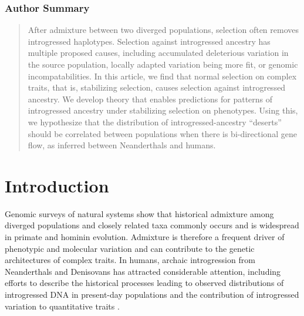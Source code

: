 \documentclass[10pt,letterpaper]{article}
\begin{document}
\begin{center}
    \subsubsection*{Author Summary}
\end{center}
\small
\begin{quote}

    After admixture between two diverged populations, selection often removes
    introgressed haplotypes. Selection against introgressed ancestry has
    multiple proposed causes, including accumulated deleterious variation in
    the source population, locally adapted variation being more fit, or genomic
    incompatabilities. In this article, we find that normal selection on
    complex traits, that is, stabilizing selection, causes selection against
    introgressed ancestry. We develop theory that enables predictions for
    patterns of introgressed ancestry under stabilizing selection on
    phenotypes. Using this, we hypothesize that the distribution of
    introgressed-ancestry ``deserts'' should be correlated between populations
    when there is bi-directional gene flow, as inferred between Neanderthals
    and humans.

\end{quote}

\normalsize

\onehalfspacing

\section*{Introduction}

Genomic surveys of natural systems show that historical admixture among
diverged populations and closely related taxa commonly occurs
\cite{brandvain2014speciation, skoglund2015ancient, suvorov2022widespread} and
is widespread in primate \cite{tung2017contribution, sorensen2023genome} and
hominin \cite{wolf2018outstanding, peter2020100} evolution. Admixture is
therefore a frequent driver of phenotypic and molecular variation and can
contribute to the genetic architectures of complex traits. In humans, archaic
introgression from Neanderthals and Denisovans has attracted considerable
attention, including efforts to describe the historical processes leading to
observed distributions of introgressed DNA in present-day populations
\cite{prufer2014complete, villanea2019multiple, chen2020identifying} and the
contribution of introgressed variation to quantitative traits
\cite{sankararaman2016combined, wei2023lingering}.
\end{document}

